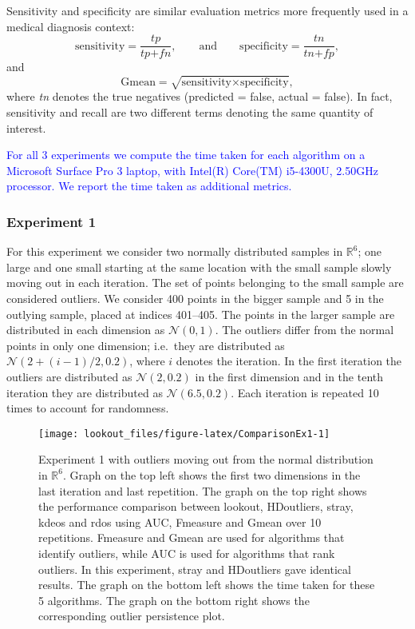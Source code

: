 \documentclass[
]{article}
\begin{document}
Sensitivity and specificity are similar evaluation metrics more
frequently used in a medical diagnosis context:
\begin{equation}\label{eq:ss}
    \text{sensitivity} = \frac{ \textit{tp} }{\textit{tp} + \textit{fn}}  , \qquad \text{and} \qquad \text{specificity} = \frac{\textit{tn}}{\textit{tn} + \textit{fp}}  ,
\end{equation} and \begin{equation}\label{eq:gmean}
    \text{Gmean} = \sqrt{ \text{sensitivity} \times \text{specificity}}  ,
\end{equation} where \emph{tn} denotes the true negatives (predicted =
false, actual = false). In fact, sensitivity and recall are two
different terms denoting the same quantity of interest.

\textcolor{blue}{For all 3 experiments we compute the time taken for each algorithm on a Microsoft Surface Pro 3 laptop, with Intel(R) Core(TM) i5-4300U, 2.50GHz processor. We report the time taken as additional metrics.}

\hypertarget{experiment-1}{%
\subsubsection*{Experiment 1}\label{experiment-1}}

For this experiment we consider two normally distributed samples in
\(\mathbb{R}^6\); one large and one small starting at the same location
with the small sample slowly moving out in each iteration. The set of
points belonging to the small sample are considered outliers. We
consider 400 points in the bigger sample and 5 in the outlying sample,
placed at indices 401--405. The points in the larger sample are
distributed in each dimension as \(\mathcal{N}(0, 1)\). The outliers
differ from the normal points in only one dimension; i.e.~they are
distributed as \(\mathcal{N}\left(2 + (i-1)/2, 0.2 \right)\), where
\(i\) denotes the iteration. In the first iteration the outliers are
distributed as \(\mathcal{N}\left(2, 0.2 \right)\) in the first
dimension and in the tenth iteration they are distributed as
\(\mathcal{N}\left(6.5, 0.2 \right)\). Each iteration is repeated 10
times to account for randomness.

\begin{figure}
\texttt{[image: lookout\_files/figure-latex/ComparisonEx1-1]} \caption{Experiment 1 with outliers moving out from the normal distribution in $\mathbb{R}^6$. Graph on the top left shows the first two dimensions in the last iteration and last repetition.  The graph on the top right shows the performance comparison between lookout, HDoutliers, stray, kdeos and rdos using AUC, Fmeasure and Gmean over 10 repetitions. Fmeasure and Gmean are used for algorithms that identify outliers, while AUC is used for algorithms that rank outliers. In this experiment, stray and HDoutliers gave identical results. The graph on the bottom left shows the time taken for these 5 algorithms. The graph on the bottom right shows the corresponding outlier persistence plot.}\label{fig:ComparisonEx1}
\end{figure}
\end{document}
